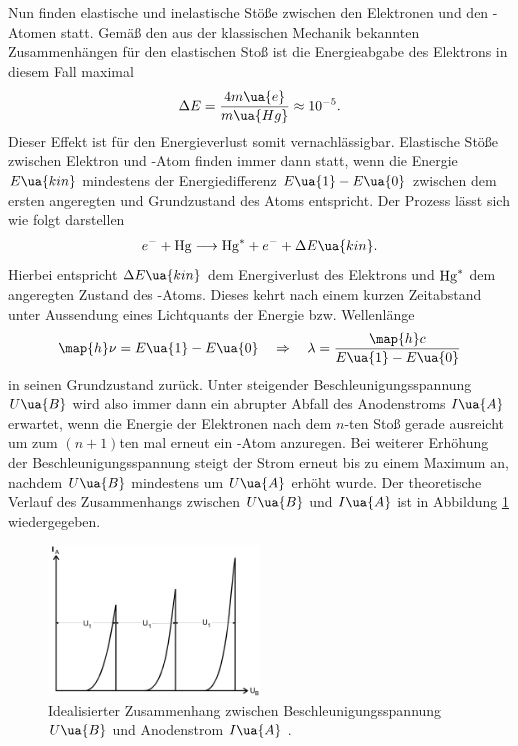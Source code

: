 Nun finden elastische und inelastische Stöße zwischen den Elektronen und den -Atomen statt. Gemäß %
den aus der klassischen Mechanik bekannten Zusammenhängen für den elastischen Stoß ist die Energieabgabe
des Elektrons in diesem Fall maximal
\begin{equation}
  \Delta E = \frac{4 m\ua{e}}{m\ua{Hg}} \approx \num{e-5}.
\end{equation}
Dieser Effekt ist für den Energieverlust somit vernachlässigbar. Elastische Stöße zwischen Elektron und
-Atom finden immer dann statt, wenn die Energie $E\ua{kin}$ mindestens der Energiedifferenz $E\ua{1} - E\ua{0}$
zwischen dem ersten angeregten und Grundzustand des  Atoms entspricht. Der Prozess lässt sich wie folgt darstellen
\begin{equation}
  e^{-} + \ce{Hg} \longrightarrow \ce{Hg}^{*} + e^{-} + \Delta E\ua{kin}.
\end{equation}
Hierbei entspricht $\Delta E\ua{kin}$ dem Energiverlust des Elektrons und $\ce{Hg}^*$ dem angeregten Zustand des
-Atoms. Dieses kehrt nach einem kurzen Zeitabstand unter Aussendung eines Lichtquants der Energie bzw. Wellenlänge
\begin{equation}
  \map{h}\nu = E\ua{1} - E\ua{0} \quad \Rightarrow \quad \lambda = \frac{\map{h} c}{E\ua{1} - E\ua{0}}
  \label{eq: wellenlänge}
\end{equation}
in seinen Grundzustand zurück. Unter steigender Beschleunigungsspannung $U\ua{B}$ wird also immer dann ein
abrupter Abfall des Anodenstroms $I\ua{A}$ erwartet, wenn die Energie der Elektronen nach dem $n$-ten Stoß gerade
ausreicht um zum $(n+1)$ten mal erneut ein -Atom anzuregen. Bei weiterer Erhöhung der Beschleunigungsspannung
steigt der Strom erneut bis zu einem Maximum an, nachdem $U\ua{B}$ mindestens um $U\ua{A}$ erhöht wurde.
Der theoretische Verlauf des Zusammenhangs zwischen
$U\ua{B}$ und $I\ua{A}$ ist in Abbildung \ref{fig: theo_verlauf} wiedergegeben.
\begin{figure}
  \centering
  \includegraphics[width = 0.5\textwidth]{pics/theo_verlauf.png}
  \caption{Idealisierter Zusammenhang zwischen Beschleunigungsspannung $U\ua{B}$ und Anodenstrom $I\ua{A}$ \cite{anleitung601}.}
  \label{fig: theo_verlauf}
\end{figure}
